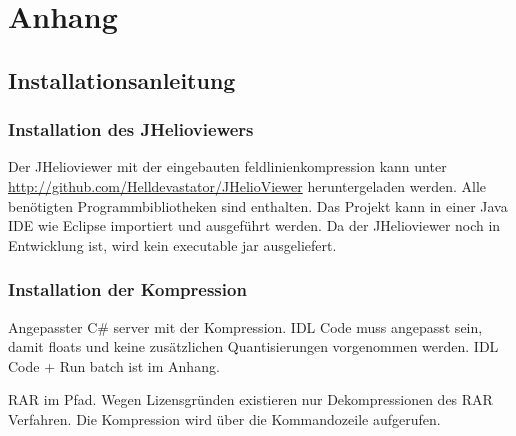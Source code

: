 \section{Anhang}
\subsection{Installationsanleitung}
\subsubsection*{Installation des JHelioviewers}
Der JHelioviewer mit der eingebauten feldlinienkompression kann unter \url{http://github.com/Helldevastator/JHelioViewer}
heruntergeladen werden. Alle benötigten Programmbibliotheken sind enthalten. Das Projekt kann in einer Java IDE wie Eclipse importiert und ausgeführt werden. Da der JHelioviewer noch in Entwicklung ist, wird kein executable jar ausgeliefert. 

\subsubsection*{Installation der Kompression}
Angepasster C\# server mit der Kompression. IDL Code muss angepasst sein, damit floats und keine zusätzlichen Quantisierungen vorgenommen werden. IDL Code + Run batch ist im Anhang.

RAR im Pfad. Wegen Lizensgründen existieren nur Dekompressionen des RAR Verfahren. Die Kompression wird über die Kommandozeile aufgerufen. 

\pagebreak

